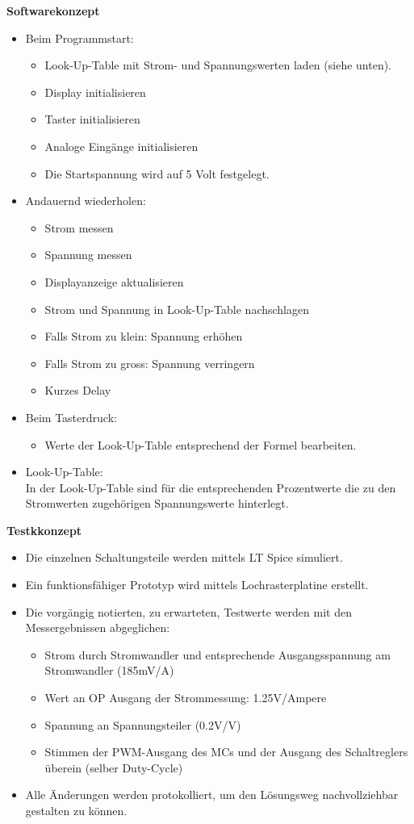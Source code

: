 \documentclass{fhnwreport}
\begin{document}
\newpage
\textbf{Softwarekonzept}
\begin{itemize}
\item Beim Programmstart:
	\begin{itemize}
	\item Look-Up-Table mit Strom- und Spannungswerten laden (siehe unten).
	\item Display initialisieren
	\item Taster initialisieren
	\item Analoge Eingänge initialisieren
	\item Die Startspannung wird auf 5 Volt festgelegt.
	\end{itemize}

\item Andauernd wiederholen:
	\begin{itemize}
	\item Strom messen
	\item Spannung messen
	\item Displayanzeige aktualisieren
	\item Strom und Spannung in Look-Up-Table nachschlagen
	\item Falls Strom zu klein: Spannung erhöhen
	\item Falls Strom zu gross: Spannung verringern
	\item Kurzes Delay
	\end{itemize}
	
\item Beim Tasterdruck:
	\begin{itemize}
	\item Werte der Look-Up-Table entsprechend der Formel bearbeiten.
	\end{itemize}
	
\item Look-Up-Table:\\
In der Look-Up-Table sind für die entsprechenden Prozentwerte die zu den Stromwerten zugehörigen Spannungswerte hinterlegt.
\end{itemize}

\textbf{Testkkonzept}
\begin{itemize}
	\item Die einzelnen Schaltungsteile werden mittels LT Spice simuliert.
	\item Ein funktionsfähiger Prototyp wird mittels Lochrasterplatine erstellt.
	\item Die vorgängig notierten, zu erwarteten, Testwerte werden mit den Messergebnissen abgeglichen:
		\begin{itemize}
		\item Strom durch Stromwandler und entsprechende Ausgangsspannung am Stromwandler (185mV/A)
		\item Wert an OP Ausgang der Strommessung: 1.25V/Ampere
		\item Spannung an Spannungsteiler (0.2V/V)
		\item Stimmen der PWM-Ausgang des MCs und der Ausgang des Schaltreglers überein	(selber Duty-Cycle)
		\end{itemize}
	\item Alle Änderungen werden protokolliert, um den Lösungsweg nachvollziehbar gestalten zu können.
\end{itemize}

%
\end{document}
